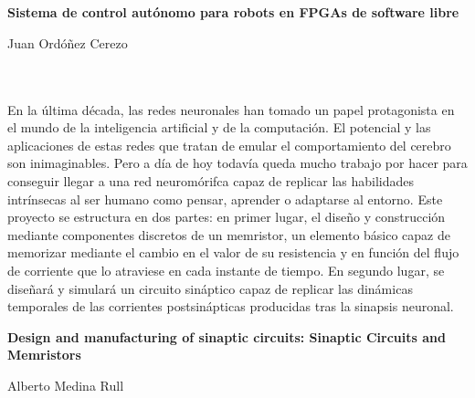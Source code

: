 \chapter*{}






\cleardoublepage
\thispagestyle{empty}

\begin{center}
{\large\bfseries  Sistema de
	control autónomo para robots en FPGAs de
	software libre}\\
\end{center}
\begin{center}
Juan Ordóñez Cerezo\\
\end{center}

\\

\vspace{0.7cm}
\\

En la última década, las redes neuronales han tomado un papel protagonista en el mundo de la inteligencia artificial y de la computación. El potencial y las aplicaciones de estas redes que tratan de emular el comportamiento del cerebro son inimaginables. Pero a día de hoy todavía queda mucho trabajo por hacer para conseguir llegar a una red neuromórifca capaz de replicar las habilidades intrínsecas al ser humano como pensar, aprender o adaptarse al entorno. Este proyecto se estructura en dos partes: en primer lugar, el diseño y construcción mediante componentes discretos de un memristor, un elemento básico capaz de memorizar mediante el cambio en el valor de su resistencia y en función del flujo de corriente que lo atraviese en cada instante de tiempo. En segundo lugar, se diseñará y simulará un circuito sináptico capaz de replicar las dinámicas temporales de las corrientes postsinápticas producidas tras la sinapsis neuronal.
\cleardoublepage


\thispagestyle{empty}


\begin{center}
{\large\bfseries Design and manufacturing of sinaptic circuits: Sinaptic Circuits and Memristors}\\
\end{center}
\begin{center}
Alberto Medina Rull\\
\end{center}

